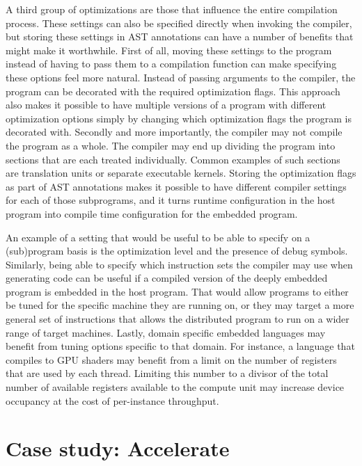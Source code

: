\documentclass[fontsize=11pt,a4paper,parskip=half,numbers=noenddot]{scrartcl}
\begin{document}
A third group of optimizations are those that influence the entire compilation
process. These settings can also be specified directly when invoking the
compiler, but storing these settings in AST annotations can have a number of
benefits that might make it worthwhile. First of all, moving these settings to
the program instead of having to pass them to a compilation function can make
specifying these options feel more natural. Instead of passing arguments to the
compiler, the program can be decorated with the required optimization flags.
This approach also makes it possible to have multiple versions of a program with
different optimization options simply by changing which optimization flags the
program is decorated with. Secondly and more importantly, the compiler may not
compile the program as a whole. The compiler may end up dividing the program
into sections that are each treated individually. Common examples of such
sections are translation units or separate executable kernels. Storing the
optimization flags as part of AST annotations makes it possible to have
different compiler settings for each of those subprograms, and it turns runtime
configuration in the host program into compile time configuration for the
embedded program.

An example of a setting that would be useful to be able to specify on a
(sub)program basis is the optimization level and the presence of debug symbols.
Similarly, being able to specify which instruction sets the compiler may use
when generating code can be useful if a compiled version of the deeply embedded
program is embedded in the host program. That would allow programs to either be
tuned for the specific machine they are running on, or they may target a more
general set of instructions that allows the distributed program to run on a
wider range of target machines. Lastly, domain specific embedded languages may
benefit from tuning options specific to that domain. For instance, a language
that compiles to GPU shaders may benefit from a limit on the number of registers
that are used by each thread. Limiting this number to a divisor of the total
number of available registers available to the compute unit may increase device
occupancy at the cost of per-instance throughput.

\section{Case study: Accelerate}

\end{document}
